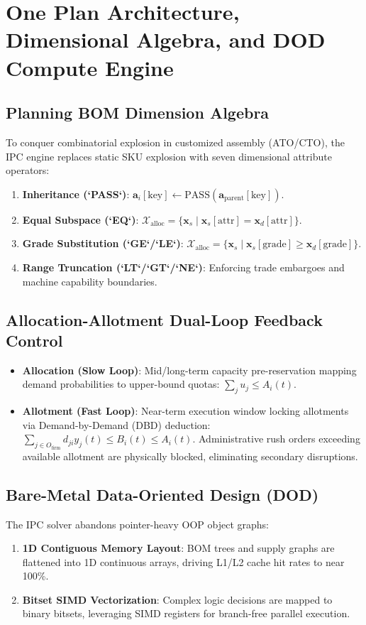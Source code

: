 \documentclass[11pt,a4paper]{article}
\begin{document}
\section{One Plan Architecture, Dimensional Algebra, and DOD Compute Engine}

\subsection{Planning BOM Dimension Algebra}
To conquer combinatorial explosion in customized assembly (ATO/CTO), the IPC engine replaces static SKU explosion with seven dimensional attribute operators:
\begin{enumerate}
    \item \textbf{Inheritance (`PASS`)}: $\mathbf{a}_i[\text{key}] \leftarrow \text{PASS}(\mathbf{a}_{\text{parent}}[\text{key}])$.
    \item \textbf{Equal Subspace (`EQ`)}: $\mathcal{X}_{\text{alloc}} = \{\mathbf{x}_s \mid \mathbf{x}_s[\text{attr}] = \mathbf{x}_d[\text{attr}]\}$.
    \item \textbf{Grade Substitution (`GE`/`LE`)}: $\mathcal{X}_{\text{alloc}} = \{\mathbf{x}_s \mid \mathbf{x}_s[\text{grade}] \ge \mathbf{x}_d[\text{grade}]\}$.
    \item \textbf{Range Truncation (`LT`/`GT`/`NE`)}: Enforcing trade embargoes and machine capability boundaries.
\end{enumerate}

\subsection{Allocation-Allotment Dual-Loop Feedback Control}
\begin{itemize}
    \item \textbf{Allocation (Slow Loop)}: Mid/long-term capacity pre-reservation mapping demand probabilities to upper-bound quotas: $\sum_j u_j \le A_i(t)$.
    \item \textbf{Allotment (Fast Loop)}: Near-term execution window locking allotments via Demand-by-Demand (DBD) deduction: $\sum_{j \in O_{\text{firm}}} d_{ji} y_j(t) \le B_i(t) \le A_i(t)$. Administrative rush orders exceeding available allotment are physically blocked, eliminating secondary disruptions.
\end{itemize}

\subsection{Bare-Metal Data-Oriented Design (DOD)}
The IPC solver abandons pointer-heavy OOP object graphs:
\begin{enumerate}
    \item \textbf{1D Contiguous Memory Layout}: BOM trees and supply graphs are flattened into 1D continuous arrays, driving L1/L2 cache hit rates to near 100\%.
    \item \textbf{Bitset SIMD Vectorization}: Complex logic decisions are mapped to binary bitsets, leveraging SIMD registers for branch-free parallel execution.
\end{enumerate}
\end{document}
